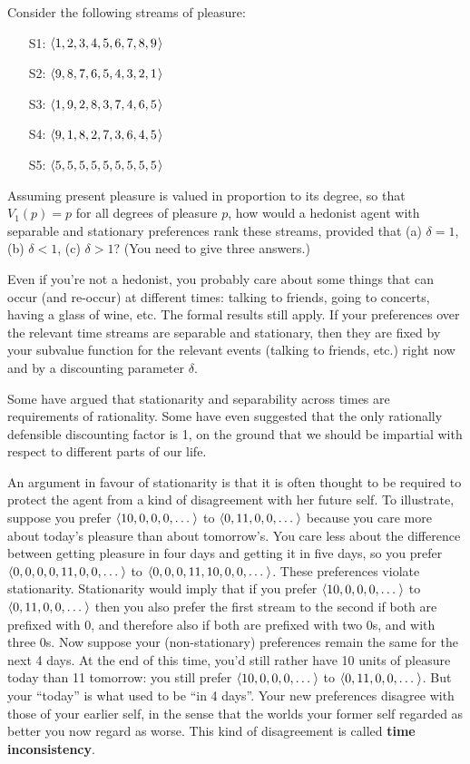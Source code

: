 \begin{exercise}{1}
  Consider the following streams of pleasure:
  \begin{enumerate}
    \itemsep-0.3em 
  \item[S1:] $\t{1,2,3,4,5,6,7,8,9}$ 
  \item[S2:] $\t{9,8,7,6,5,4,3,2,1}$
  \item[S3:] $\t{1,9,2,8,3,7,4,6,5}$ 
  \item[S4:] $\t{9,1,8,2,7,3,6,4,5}$ 
  \item[S5:] $\t{5,5,5,5,5,5,5,5,5}$
  \end{enumerate}
  Assuming present pleasure is valued in proportion to its degree, so
  that $V_1(p) = p$ for all degrees of pleasure $p$, how would a
  hedonist agent with separable and stationary preferences rank these
  streams, provided that (a) $\delta = 1$, (b)
  $\delta < 1$, (c) $\delta > 1$? (You need to give three answers.)
\end{exercise}

Even if you're not a hedonist, you probably care about some things that can
occur (and re-occur) at different times: talking to friends, going to concerts,
having a glass of wine, etc. The formal results still apply. If your preferences
over the relevant time streams are separable and stationary, then they are fixed
by your subvalue function for the relevant events (talking to friends, etc.)
right now and by a discounting parameter $\delta$.

Some have argued that stationarity and separability across times are
requirements of rationality. Some have even suggested that the only rationally
defensible discounting factor is 1, on the ground that we should be impartial
with respect to different parts of our life.

An argument in favour of stationarity is that it is often thought to be required
to protect the agent from a kind of disagreement with her future self. To
illustrate, suppose you prefer $\t{10, 0, 0, 0, \ldots}$ to
$\t{0, 11, 0, 0, \ldots}$ because you care more about today's pleasure than
about tomorrow's. You care less about the difference between getting pleasure in
four days and getting it in five days, so you prefer
$\t{0, 0, 0, 0, 11, 0, 0, \ldots}$ to $\t{0, 0, 0, 11, 10, 0, 0, \ldots}$. These
preferences violate stationarity. Stationarity would imply that if you prefer
$\t{10, 0, 0, 0, \ldots}$ to $\t{0, 11, 0, 0, \ldots}$ then you also prefer the
first stream to the second if both are prefixed with 0, and therefore also if
both are prefixed with two 0s, and with three 0s. Now suppose your
(non-stationary) preferences remain the same for the next 4 days. At the end of
this time, you'd still rather have 10 units of pleasure today than 11 tomorrow:
you still prefer $\t{10, 0, 0, 0, \ldots}$ to $\t{0, 11, 0, 0, \ldots}$. But
your ``today'' is what used to be ``in 4 days''. Your new preferences disagree
with those of your earlier self, in the sense that the worlds your former self
regarded as better you now regard as worse. This kind of disagreement is called
\textbf{time inconsistency}.

